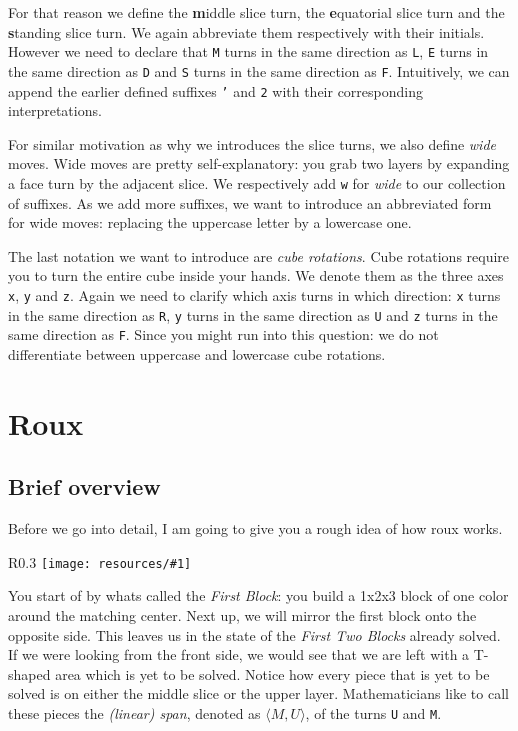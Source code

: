 \documentclass{scrreprt}
\newcommand{\wrapfig}[5] {
	\begin{wrapfigure}{#2}{#3\textwidth}
	\centering
	\texttt{[image: resources/\#1]}
	\caption*{#5}
	\end{wrapfigure}
}
\begin{document}
For that reason we define the \textbf{m}iddle slice turn, the \textbf{e}quatorial slice turn and the \textbf{s}tanding slice turn. We again abbreviate them respectively with their initials. However we need to declare that \texttt{M} turns in the same direction as \texttt{L}, \texttt{E} turns in the same direction as \texttt{D} and \texttt{S} turns in the same direction as \texttt{F}. Intuitively, we can append the earlier defined suffixes \texttt{'} and \texttt{2} with their corresponding interpretations.\par

For similar motivation as why we introduces the slice turns, we also define \emph{wide} moves. Wide moves are pretty self-explanatory: you grab two layers by expanding a face turn by the adjacent slice. We respectively add \texttt{w} for \emph{wide} to our collection of suffixes. As we add more suffixes, we want to introduce an abbreviated form for wide moves: replacing the uppercase letter by a lowercase one.\par

The last notation we want to introduce are \emph{cube rotations}. Cube rotations require you to turn the entire cube inside your hands. We denote them as the three axes \texttt{x}, \texttt{y} and \texttt{z}. Again we need to clarify which axis turns in which direction: \texttt{x} turns in the same direction as \texttt{R}, \texttt{y} turns in the same direction as \texttt{U} and \texttt{z} turns in the same direction as \texttt{F}. Since you might run into this question: we do not differentiate between uppercase and lowercase cube rotations.


\chapter{Roux}

\section{Brief overview}

Before we go into detail, I am going to give you a rough idea of how roux works.\par

\wrapfig{f2b_transparent.png}{R}{0.3}{0.3}{The First Two Blocks}

You start of by whats called the \emph{First Block}: you build a 1x2x3 block of one color around the matching center. Next up, we will mirror the first block onto the opposite side. This leaves us in the state of the \emph{First Two Blocks} already solved. If we were looking from the front side, we would see that we are left with a T-shaped area which is yet to be solved. Notice how every piece that is yet to be solved is on either the middle slice or the upper layer. Mathematicians like to call these pieces the \emph{(linear) span}, denoted as $\langle M, U \rangle$, of the turns \texttt{U} and \texttt{M}.\par
\end{document}
